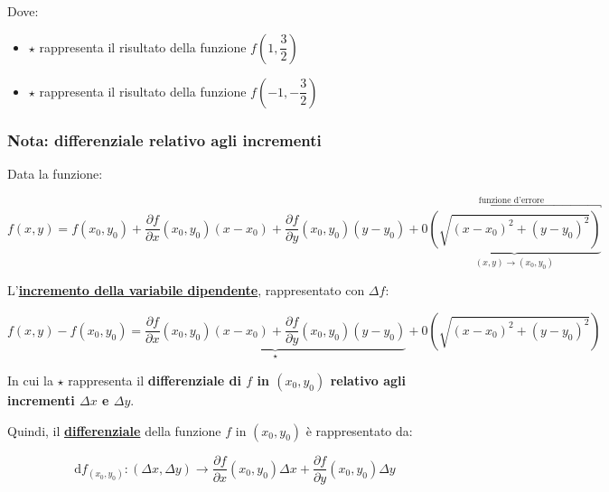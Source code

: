 \documentclass[a4paper]{article}
\begin{document}
	Dove:
	
	\begin{itemize}[label=-]
		\item \textcolor{Red3}{$\star$} rappresenta il risultato della funzione $f\left(1,\dfrac{3}{2}\right)$
		\item \textcolor{Green4}{$\star$} rappresenta il risultato della funzione $f\left(-1, -\dfrac{3}{2}\right)$
	\end{itemize}

	\newpage
	
	\subsubsection{Nota: differenziale relativo agli incrementi}
	
	Data la funzione:
	
	\begin{equation*}
		f\left(x,y\right) = f\left(x_{0},y_{0}\right) + \dfrac{\partial f}{\partial x}\left(x_{0},y_{0}\right)\left(x-x_{0}\right) + \dfrac{\partial f}{\partial y}\left(x_{0},y_{0}\right)\left(y-y_{0}\right) + \overbracket{0\underbrace{\left(\sqrt{\left(x-x_{0}\right)^{2} + \left(y-y_{0}\right)^{2}}\right)}_{\left(x,y\right) \rightarrow \left(x_{0},y_{0}\right)}}^{\text{funzione d'errore}}
	\end{equation*}

	\noindent
	L'\textcolor{Red3}{\textbf{\underline{incremento della variabile dipendente}}}, rappresentato con $\Delta f$:
	
	\begin{equation*}
		f\left(x,y\right) - f\left(x_{0},y_{0}\right) = \underbrace{\dfrac{\partial f}{\partial x}\left(x_{0},y_{0}\right)\left(x-x_{0}\right) + \dfrac{\partial f}{\partial y}\left(x_{0},y_{0}\right)\left(y-y_{0}\right)}_{\star} + 0\left(\sqrt{\left(x-x_{0}\right)^{2} + \left(y-y_{0}\right)^{2}}\right)
	\end{equation*}

	\noindent
	In cui la $\star$ rappresenta il \textcolor{Red3}{\textbf{differenziale di $f$ in $\left(x_{0},y_{0}\right)$ relativo agli incrementi $\Delta x$ e $\Delta y$}}.\newline
	
	\noindent
	Quindi, il \textcolor{Red3}{\textbf{\underline{differenziale}}} della funzione $f$ in $\left(x_{0},y_{0}\right)$ è rappresentato da:
	
	\begin{equation*}
		\mathrm{d}f_{\left(x_{0},y_{0}\right)} : \left(\Delta x, \Delta y\right) \longrightarrow \dfrac{\partial f}{\partial x}\left(x_{0},y_{0}\right)\Delta x + \dfrac{\partial f}{\partial y}\left(x_{0},y_{0}\right) \Delta y
	\end{equation*}
\end{document}
